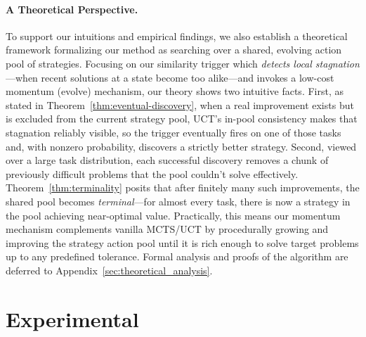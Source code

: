 \documentclass{article} %
\theoremstyle{definition}
\theoremstyle{remark}
\begin{document}
\paragraph{A Theoretical Perspective.}
To support our intuitions and empirical findings, 
we also establish a theoretical framework  formalizing our method as searching over a shared, evolving action pool of strategies. Focusing on our similarity trigger which \textit{detects local stagnation}—when recent solutions at a state become too alike—and invokes a low-cost momentum (evolve) mechanism, our theory shows two intuitive facts. 
First, as stated in Theorem~\ref{thm:eventual-discovery}, when a real improvement exists but is excluded from the current strategy pool, UCT’s in-pool consistency makes that stagnation reliably visible, so the trigger eventually fires on one of those tasks and, with nonzero probability, discovers a strictly better strategy. 
Second, viewed over a large task distribution, each successful discovery removes a chunk of previously difficult problems that the pool couldn’t solve effectively. Theorem~\ref{thm:terminality} posits that after finitely many such improvements, the shared pool becomes \textit{terminal}—for almost every task, there is now a strategy in the pool achieving near-optimal value. 
Practically, this means our momentum mechanism complements vanilla MCTS/UCT by procedurally growing and improving the strategy action pool until it is rich enough to solve target problems up to any predefined tolerance.
Formal analysis and proofs of the algorithm are deferred to Appendix~\ref{sec:theoretical_analysis}.

\section{Experimental}
\end{document}
